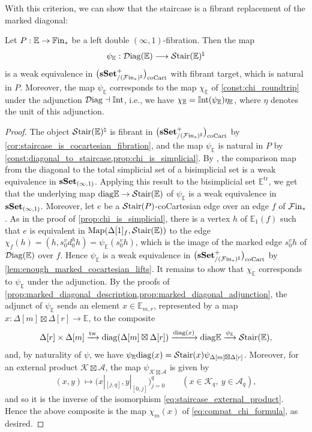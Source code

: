 \documentclass[10pt,reqno]{amsart}
\begin{document}
With this criterion, we can show that the staircase is a fibrant
replacement of the marked diagonal:

\begin{proposition}
\label{prop:diagonal_to_staircase_cocart_equivalence}
Let $P:\mathbb E\to\mathbb{F}\mathrm{in}_*$ be a left double
$(\infty,1)$-fibration. Then the map
\[
\psi_{\mathbb E}:\mathcal{D}\mathrm{iag}(\mathbb E)\longrightarrow
\mathcal{S}\mathrm{tair}(\mathbb E)^\natural
\]
is a weak equivalence in $\bigl(\mathbf{sSet}^+_{/(\mathcal{F}\mathrm{in}_*)^\sharp}\bigr)_{\mathrm{coCart}}$ with fibrant target, which is
natural in $P$. Moreover, the map $\psi_{\mathbb E}$ corresponds to
the map $\chi_{\mathbb E}$ of \cref{const:chi_roundtrip} under the
adjunction $\mathcal{D}\mathrm{iag}\dashv\mathbb{I}\mathrm{nt}$, i.e., we have
$\chi_{\mathbb E}=\mathbb{I}\mathrm{nt}(\psi_{\mathbb E})\eta_{\mathbb E}$, where
$\eta$ denotes the unit of this adjunction.
\end{proposition}

\begin{proof}
The object $\mathcal{S}\mathrm{tair}(\mathbb E)^\natural$ is fibrant in $\bigl(\mathbf{sSet}^+_{/(\mathcal{F}\mathrm{in}_*)^\sharp}\bigr)_{\mathrm{coCart}}$ by
\cref{cor:staircase_is_cocartesian_fibration}, and the map
$\psi_{\mathbb E}$ is natural in $P$ by
\cref{const:diagonal_to_staircase,prop:chi_is_simplicial}. By
\cite[Theorem~1.2]{Stevenson2025TotalSimplicialSet}, the comparison
map from the diagonal to the total simplicial set of a bisimplicial
set is a weak equivalence in $\mathbf{sSet}_{(\infty,1)}$. Applying this
result to the bisimplicial set $\mathbb E^{\mathrm{tr}}$, we get
that the underlying map $\mathrm{diag}\mathbb E\to\mathcal{S}\mathrm{tair}(\mathbb E)$ of
$\psi_{\mathbb E}$ is a weak equivalence in $\mathbf{sSet}_{(\infty,1)}$.
Moreover, let $e$ be a $\mathcal{S}\mathrm{tair}(P)$-coCartesian edge over an edge
$f$ of $\mathcal{F}\mathrm{in}_*$. As in the proof of \cref{prop:chi_is_simplicial},
there is a vertex $h$ of $\mathbb E_1(f)$ such that $e$ is
equivalent in $\operatorname{Map}(\Delta[1]_f,\mathcal{S}\mathrm{tair}(\mathbb E))$ to the edge
$\chi_f(h)=(h,s_0^v d_0^h h)=\psi_{\mathbb E}(s_0^v h)$, which is the
image of the marked edge $s_0^v h$ of $\mathcal{D}\mathrm{iag}(\mathbb E)$ over
$f$. Hence $\psi_{\mathbb E}$ is a weak equivalence in $\bigl(\mathbf{sSet}^+_{/(\mathcal{F}\mathrm{in}_*)^\sharp}\bigr)_{\mathrm{coCart}}$
by \cref{lem:enough_marked_cocartesian_lifts}. It remains to show that
$\chi_{\mathbb E}$ corresponds to $\psi_{\mathbb E}$ under the
adjunction. By the proofs of
\cref{prop:marked_diagonal_description,prop:marked_diagonal_adjunction},
the adjunct of $\psi_{\mathbb E}$ sends an element
$x\in\mathbb E_{m,r}$, represented by a map
$x:\Delta[m]\boxtimes\Delta[r]\to\mathbb E$, to the composite
\[
 \Delta[r]\times\Delta[m]
 \xrightarrow{\mathrm{tw}}
 \mathrm{diag}(\Delta[m]\boxtimes\Delta[r])
 \xrightarrow{\mathrm{diag}(x)}\mathrm{diag}\mathbb E
 \xrightarrow{\psi_{\mathbb E}}\mathcal{S}\mathrm{tair}(\mathbb E),
\]
and, by naturality of $\psi$, we have
$\psi_{\mathbb E}\mathrm{diag}(x)=
\mathcal{S}\mathrm{tair}(x)\psi_{\Delta[m]\boxtimes\Delta[r]}$. Moreover, for an
external product $\mathcal K\boxtimes \mathcal A$, the map
$\psi_{\mathcal K\boxtimes\mathcal A}$ is given by
\[
 (x,y)\longmapsto
 \bigl(x|_{[j,q]},y|_{[0,j]}\bigr)_{j=0}^q
 \qquad(x\in\mathcal K_q,\ y\in\mathcal A_q),
\]
and so it is the inverse of the isomorphism
\eqref{eq:staircase_external_product}. Hence the above composite is
the map $\chi_m(x)$ of \eqref{eq:compat_chi_formula}, as desired.
\end{proof}
\end{document}
